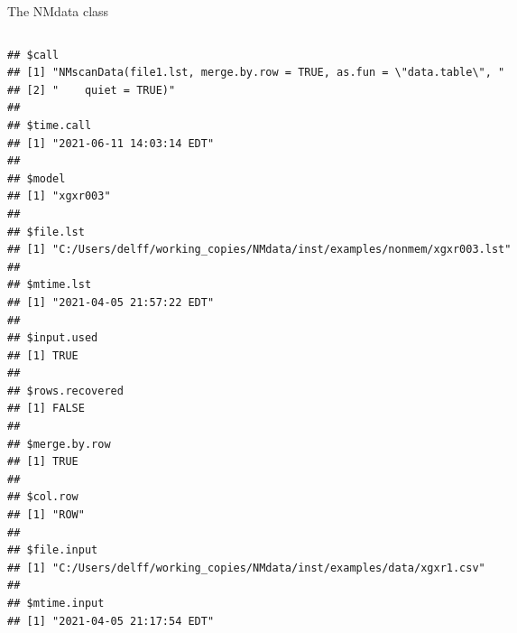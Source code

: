 \documentclass[
  8pt,
  ignorenonframetext,
  aspectratio=169]{beamer}
\begin{document}
\begin{frame}[fragile]{The NMdata class}
\begin{columns}[T]
\begin{column}{0.48\textwidth}
\begin{verbatim}
## $call
## [1] "NMscanData(file1.lst, merge.by.row = TRUE, as.fun = \"data.table\", "
## [2] "    quiet = TRUE)"                                                   
## 
## $time.call
## [1] "2021-06-11 14:03:14 EDT"
## 
## $model
## [1] "xgxr003"
## 
## $file.lst
## [1] "C:/Users/delff/working_copies/NMdata/inst/examples/nonmem/xgxr003.lst"
## 
## $mtime.lst
## [1] "2021-04-05 21:57:22 EDT"
## 
## $input.used
## [1] TRUE
## 
## $rows.recovered
## [1] FALSE
## 
## $merge.by.row
## [1] TRUE
## 
## $col.row
## [1] "ROW"
## 
## $file.input
## [1] "C:/Users/delff/working_copies/NMdata/inst/examples/data/xgxr1.csv"
## 
## $mtime.input
## [1] "2021-04-05 21:17:54 EDT"
\end{verbatim}
\end{column}
\end{columns}
\end{frame}
\end{document}
